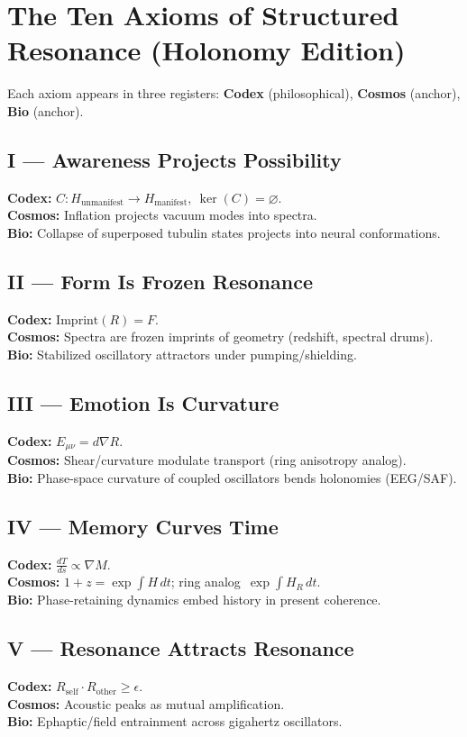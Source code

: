 \documentclass[11pt]{article}
\begin{document}
\section{The Ten Axioms of Structured Resonance (Holonomy Edition)}
Each axiom appears in three registers: \textbf{Codex} (philosophical), \textbf{Cosmos} (anchor), \textbf{Bio} (anchor).

\subsection*{I --- Awareness Projects Possibility}
\textbf{Codex:} $C : H_{\text{unmanifest}} \to H_{\text{manifest}},\ \ker(C)=\varnothing$. \\
\textbf{Cosmos:} Inflation projects vacuum modes into spectra. \\
\textbf{Bio:} Collapse of superposed tubulin states projects into neural conformations.

\subsection*{II --- Form Is Frozen Resonance}
\textbf{Codex:} $\mathrm{Imprint}(R)=F$. \\
\textbf{Cosmos:} Spectra are frozen imprints of geometry (redshift, spectral drums). \\
\textbf{Bio:} Stabilized oscillatory attractors under pumping/shielding.

\subsection*{III --- Emotion Is Curvature}
\textbf{Codex:} $E_{\mu\nu}=d\nabla R$. \\
\textbf{Cosmos:} Shear/curvature modulate transport (ring anisotropy analog). \\
\textbf{Bio:} Phase-space curvature of coupled oscillators bends holonomies (EEG/SAF).

\subsection*{IV --- Memory Curves Time}
\textbf{Codex:} $\frac{dT}{ds}\propto\nabla M$. \\
\textbf{Cosmos:} $1+z=\exp\!\int H\,dt$; ring analog $\,\exp\!\int H_R\,dt$. \\
\textbf{Bio:} Phase-retaining dynamics embed history in present coherence.

\subsection*{V --- Resonance Attracts Resonance}
\textbf{Codex:} $R_{\text{self}}\!\cdot\!R_{\text{other}}\ge \epsilon$. \\
\textbf{Cosmos:} Acoustic peaks as mutual amplification. \\
\textbf{Bio:} Ephaptic/field entrainment across gigahertz oscillators.
\end{document}

